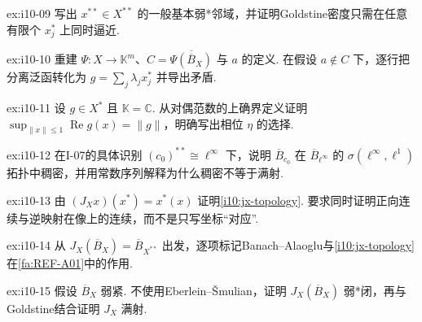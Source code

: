 \begin{FAExercise}[Goldstine基本邻域]{ex:i10-09}
写出 \(\displaystyle x^{**}\in X^{**}\) 的一般基本弱*邻域，并证明Goldstine密度只需在任意有限个 \(\displaystyle x_j^*\) 上同时逼近.
\end{FAExercise}

\begin{FAExercise}[Goldstine有限维分离]{ex:i10-10}
重建 \(\displaystyle \Psi:X\to\mathbb K^m\)、\(\displaystyle C=\overline{\Psi(\overline B_X)}\) 与 \(\displaystyle a\) 的定义. 在假设 \(\displaystyle a\notin C\) 下，逐行把分离泛函转化为 \(\displaystyle g=\sum_j\lambda_jx_j^*\) 并导出矛盾.
\end{FAExercise}

\begin{FAExercise}[复数域的相位步骤]{ex:i10-11}
设 \(\displaystyle g\in X^*\) 且 \(\displaystyle \mathbb K=\mathbb C\). 从对偶范数的上确界定义证明 \(\displaystyle \sup_{\|x\|\leqslant1}\operatorname{Re}g(x)=\|g\|\)，明确写出相位 \(\displaystyle \eta\) 的选择.
\end{FAExercise}

\begin{FAExercise}{ex:i10-12}
在I-07的具体识别 \(\displaystyle (c_0)^{**}\cong\ell^\infty\) 下，说明 \(\displaystyle \overline B_{c_0}\) 在 \(\displaystyle \overline B_{\ell^\infty}\) 的 \(\displaystyle \sigma(\ell^\infty,\ell^1)\) 拓扑中稠密，并用常数序列解释为什么稠密不等于满射.
\end{FAExercise}

\begin{FAExercise}[自然嵌入的拓扑相容性]{ex:i10-13}
由 \(\displaystyle (J_Xx)(x^*)=x^*(x)\) 证明\autoref{i10:jx-topology}. 要求同时证明正向连续与逆映射在像上的连续，而不是只写坐标“对应”.
\end{FAExercise}

\begin{FAExercise}[自反单位球的弱紧性]{ex:i10-14}
从 \(\displaystyle J_X(\overline B_X)=\overline B_{X^{**}}\) 出发，逐项标记Banach--Alaoglu与\autoref{i10:jx-topology}在\autoref{fa:REF-A01}中的作用.
\end{FAExercise}

\begin{FAExercise}[弱紧单位球推出自反]{ex:i10-15}
假设 \(\displaystyle \overline B_X\) 弱紧. 不使用Eberlein--\v Smulian，证明 \(\displaystyle J_X(\overline B_X)\) 弱*闭，再与Goldstine结合证明 \(\displaystyle J_X\) 满射.
\end{FAExercise}

